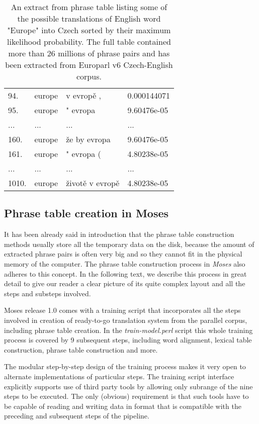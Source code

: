 \begin{table}[h]
\begin{tabular}{ l l l l}
94. & europe & v evropě , & 0.000144071 \\
95. & europe & " evropa & 9.60476e-05 \\
... & ... & ... & ... \\
160. & europe & že by evropa & 9.60476e-05 \\
161. & europe & " evropa ( & 4.80238e-05 \\
... & ... & ... & ... \\
1010. & europe & životě v evropě & 4.80238e-05 \\
\hline
\hline
\end{tabular}
\caption{\label{phrase-table-europarl}
An extract from phrase table listing some of the possible translations of English word
"Europe" into Czech sorted by their maximum likelihood probability.
The full table contained more than 26 millions of phrase pairs and has been extracted
from Europarl v6 Czech-English corpus.}
\end{table}

\subsection{Phrase table creation in Moses}
\label{sec:phrase-table-creation-in-moses}

It has been already said in introduction that the phrase table construction methods
usually store all the temporary data on the disk, because the amount of extracted
phrase pairs is often very big and so they cannot fit in the physical memory of
the computer.
The phrase table construction process in \emph{Moses} also adheres to this concept.
In the following text, we describe this process in great detail to give our reader
a clear picture of its quite complex layout and all the steps and substeps involved.

Moses release 1.0 comes
with a training script that incorporates all the steps involved in creation of
ready-to-go translation system from the parallel corpus, including phrase table creation.
In the \emph{train-model.perl} script this whole training process is covered by
9 subsequent steps,
including word alignment, lexical table construction, phrase table construction and more.

The modular step-by-step design of the training process makes it very open to
alternate implementations of particular steps.
The training script interface explicitly supports use of third party tools by
allowing only subrange of the nine steps to be executed.
The only (obvious) requirement is that such tools have to be capable of reading and
writing data in format that is compatible with the preceding and subsequent steps
of the pipeline.

